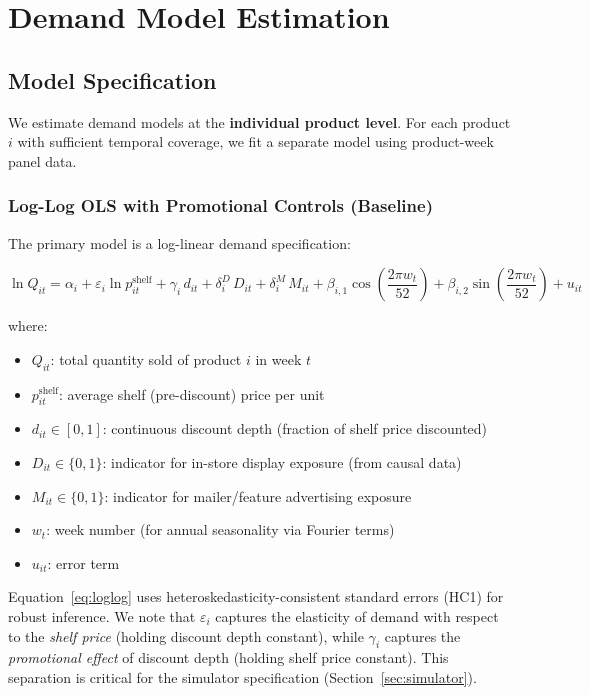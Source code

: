 \documentclass[12pt,a4paper]{article}
\begin{document}
\section{Demand Model Estimation}
\label{sec:demand}

\subsection{Model Specification}

We estimate demand models at the \textbf{individual product level}.
For each product $i$ with sufficient temporal coverage, we fit a
separate model using product-week panel data.

\subsubsection{Log-Log OLS with Promotional Controls (Baseline)}

The primary model is a log-linear demand specification:

\begin{equation}
\label{eq:loglog}
\ln Q_{it} = \alpha_i + \varepsilon_i \ln p_{it}^{\text{shelf}}
+ \gamma_i \, d_{it}
+ \delta_i^D \, D_{it}
+ \delta_i^M \, M_{it}
+ \beta_{i,1} \cos\!\left(\frac{2\pi w_t}{52}\right)
+ \beta_{i,2} \sin\!\left(\frac{2\pi w_t}{52}\right)
+ u_{it}
\end{equation}

where:
\begin{itemize}[nosep]
\item $Q_{it}$: total quantity sold of product $i$ in week $t$
\item $p_{it}^{\text{shelf}}$: average shelf (pre-discount) price
per unit
\item $d_{it} \in [0, 1]$: continuous discount depth (fraction of
shelf price discounted)
\item $D_{it} \in \{0,1\}$: indicator for in-store display exposure
(from causal data)
\item $M_{it} \in \{0,1\}$: indicator for mailer/feature advertising
exposure
\item $w_t$: week number (for annual seasonality via Fourier terms)
\item $u_{it}$: error term
\end{itemize}

Equation~\eqref{eq:loglog} uses heteroskedasticity-consistent
standard errors (HC1) for robust inference. We note that
$\varepsilon_i$ captures the elasticity of demand with respect to the
\emph{shelf price} (holding discount depth constant), while $\gamma_i$
captures the \emph{promotional effect} of discount depth
(holding shelf price constant). This separation is critical for the
simulator specification (Section~\ref{sec:simulator}).
\end{document}
